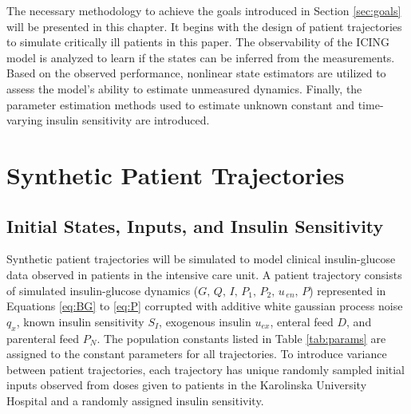 \documentclass[nomenclature, english, bibtex]{kththesis}
\begin{document}

The necessary methodology to achieve the goals introduced in Section \ref{sec:goals} will be presented in this chapter. It begins with the design of patient trajectories to simulate critically ill patients in this paper. The observability of the \gls{ICING} model is analyzed to learn if the states can be inferred from the measurements. Based on the observed performance, nonlinear state estimators are utilized to assess the model's ability to estimate unmeasured dynamics. Finally, the parameter estimation methods used to estimate unknown constant and time-varying insulin sensitivity are introduced.

\section{Synthetic Patient Trajectories}
\label{sec:patientCohort}
\subsection{Initial States, Inputs, and Insulin Sensitivity}\label{sec:init}
Synthetic patient trajectories will be simulated to model clinical insulin-glucose data observed in patients in the intensive care unit. A patient trajectory consists of simulated insulin-glucose dynamics ($G,\,Q,\,I,\,P_1,\,P_2,\,u_{\,en},\,P$) represented in Equations \eqref{eq:BG} to \eqref{eq:P} corrupted with additive white gaussian process noise $q_x$, known insulin sensitivity $S_I$, exogenous insulin $u_{ex}$, enteral feed $D$, and parenteral feed $P_N$. The population constants listed in Table \ref{tab:params} are assigned to the constant parameters for all trajectories. To introduce variance between patient trajectories, each trajectory has unique randomly sampled initial inputs observed from doses given to patients in the Karolinska University Hospital and a randomly assigned insulin sensitivity.
\end{document}
